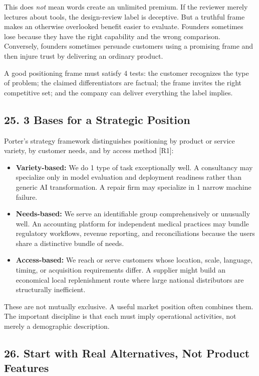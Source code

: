 This does \emph{not} mean words create an unlimited premium. If the reviewer merely lectures about tools, the design-review label is deceptive. But a truthful frame makes an otherwise overlooked benefit easier to evaluate. Founders sometimes lose because they have the right capability and the wrong comparison. Conversely, founders sometimes persuade customers using a promising frame and then injure trust by delivering an ordinary product.

A good positioning frame must satisfy 4 tests: the customer recognizes the type of problem; the claimed differentiators are factual; the frame invites the right competitive set; and the company can deliver everything the label implies.

\subsection*{25. 3 Bases for a Strategic Position}

Porter's strategy framework distinguishes positioning by product or service variety, by customer needs, and by access method [R1]:

\begin{itemize}
    \item \textbf{Variety-based:} We do 1 type of task exceptionally well. A consultancy may specialize only in model evaluation and deployment readiness rather than generic AI transformation. A repair firm may specialize in 1 narrow machine failure.
    \item \textbf{Needs-based:} We serve an identifiable group comprehensively or unusually well. An accounting platform for independent medical practices may bundle regulatory workflows, revenue reporting, and reconciliations because the users share a distinctive bundle of needs.
    \item \textbf{Access-based:} We reach or serve customers whose location, scale, language, timing, or acquisition requirements differ. A supplier might build an economical local replenishment route where large national distributors are structurally inefficient.
\end{itemize}

These are not mutually exclusive. A useful market position often combines them. The important discipline is that each must imply operational activities, not merely a demographic description.

\subsection*{26. Start with Real Alternatives, Not Product Features}

